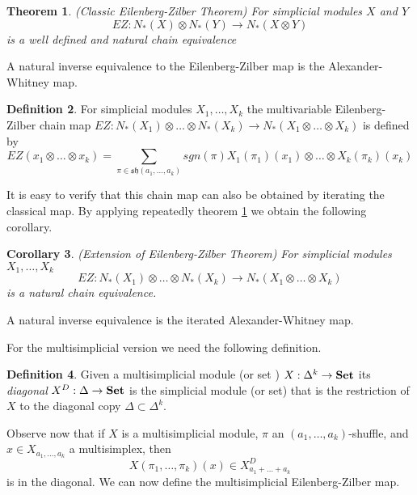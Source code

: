 \documentclass[a4paper,11pt]{article}
\newtheorem{theorem}{Theorem}[section]
\newtheorem{corollary}[theorem]{Corollary}
\theoremstyle{remark}
\theoremstyle{definition}
\newtheorem{definition}[theorem]{Definition}
\begin{document}
\begin{theorem}(Classic Eilenberg-Zilber Theorem)
	\label{EZtheorem}
For simplicial modules $X$ and $Y$ 
	$$EZ:  N_*(X)\otimes N_*(Y)  \to N_*(X\otimes  Y)$$ is a well defined and natural chain equivalence
\end{theorem} 

A natural inverse equivalence to the Eilenberg-Zilber map is the Alexander-Whitney map. 



\begin{definition}
For simplicial modules $X_1,\dots,X_k$ the multivariable Eilenberg-Zilber chain map
$EZ: N_{*}(X_{1})\otimes\dots \otimes N_{*}(X_{k}) \to N_*(X_1 \otimes \dots \otimes X_k)$ 
is defined by  $$EZ(x_1 \otimes \dots \otimes x_k) =  \sum_{\pi \in \mathfrak{sh}(a_{1},\dots,a_{k})} sgn(\pi) X_1(\pi_{1})(x_1) 
\otimes  \dots \otimes  X_k(\pi_k)(x_k)$$
\end{definition}
It is easy to verify that this chain map can also be obtained by iterating the classical map. %
By applying repeatedly theorem  \ref{EZtheorem}%
 we obtain the following corollary.

\begin{corollary}(Extension of Eilenberg-Zilber Theorem)
\label{extez}
For simplicial modules $X_{1},\dots,X_{k}$  
	$$EZ: N_*(X_{1})\otimes\dots \otimes N_*(X_{k}) \to N_*(X_{1}\otimes \dots \otimes X_{k})$$
is a natural chain equivalence.	
\end{corollary}
A natural inverse equivalence is the iterated Alexander-Whitney map.

For the multisimplicial version we need the following definition.
\begin{definition}
Given a multisimplicial module (or set ) $X:\Delta^k \to {\bf Set}$ its {\em diagonal}  $X^D:\Delta \to {\bf Set}$ 
is the simplicial module (or set) that is the restriction of $X$ to the diagonal copy $\Delta \subset \Delta^k$.
\end{definition}

Observe now that if $X$ is a multisimplicial module, $\pi$ an $(a_1,\dots,a_k)$-shuffle, and $x \in X_{a_1,\dots,a_k}$ a multisimplex, then 
$$X(\pi_{1}, \dots, \pi_k) (x) \in X^D_{a_1+ \dots + a_k}$$ is in the diagonal.
We can now define the multisimplicial Eilenberg-Zilber map.
\end{document}
